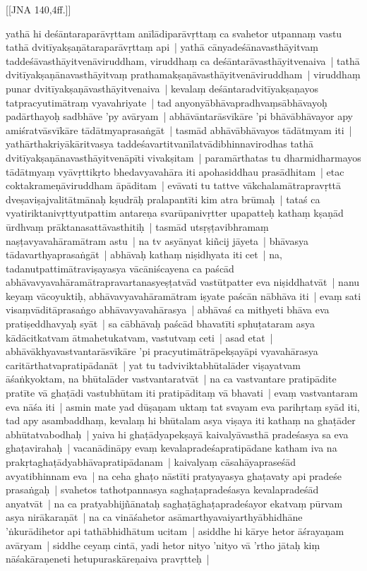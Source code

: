 \documentclass[article,12pt,a4paper]{memoir}
\newcommand{\name}[1]{#1}
\begin{document}
	[[JNA 140,4ff.]]

	  \pstart yathā hi deśāntaraparāvṛttam anīlādiparāvṛttaṃ ca svahetor utpannaṃ vastu tathā dvitīyakṣaṇātaraparāvṛttaṃ api | yathā cānyadeśānavasthāyitvaṃ taddeśāvasthāyitvenāviruddham, viruddhaṃ ca deśāntarāvasthāyitvenaiva | tathā dvitīyakṣaṇānavasthāyitvaṃ prathamakṣaṇāvasthāyitvenāviruddham | viruddhaṃ punar dvitīyakṣaṇāvasthāyitvenaiva | kevalaṃ deśāntaradvitīyakṣaṇayos tatpracyutimātraṃ vyavahriyate | tad anyonyābhāvapradhvaṃsābhāvayoḥ padārthayoḥ sadbhāve 'py avāryam | abhāvāntarāsvīkāre 'pi bhāvābhāvayor apy amiśratvāsvīkāre tādātmyaprasaṅgāt | tasmād abhāvābhāvayos tādātmyam iti | \label{thakur75-122.16} yathārthakriyākāritvasya taddeśavartitvanīlatvādibhinnavirodhas tathā dvitīyakṣaṇānavasthāyitvenāpīti vivakṣitam | paramārthatas tu dharmidharmayos tādātmyaṃ vyāvṛttikṛto bhedavyavahāra iti \name{apohasiddhau} prasādhitam | etac coktakrameṇāviruddham āpāditam | evāvati tu tattve vākchalamātrapravṛttā dveṣaviṣajvalitātmānaḥ kṣudrāḥ pralapantīti kim atra brūmaḥ | \label{thakur75-122.21} tataś ca vyatiriktanivṛttyutpattim antareṇa svarūpanivṛtter upapatteḥ kathaṃ kṣaṇād ūrdhvaṃ prāktanasattāvasthitiḥ | tasmād utsṛṣṭavibhramaṃ naṣṭavyavahāramātram astu | na tv asyānyat kiñcij jāyeta | \label{thakur75-122.23} bhāvasya tādavarthyaprasaṅgāt | abhāvaḥ kathaṃ niṣidhyata iti cet | \label{thakur75-122.24} na, tadanutpattimātraviṣayasya vācāniścayena ca paścād abhāvavyavahāramātrapravartanasyeṣṭatvād vastūtpatter eva niṣiddhatvāt | \label{thakur75-122.26} nanu keyaṃ vācoyuktiḥ, abhāvavyavahāramātram iṣyate paścān nābhāva iti | evaṃ sati visaṃvāditāprasaṅgo abhāvavyavahārasya | abhāvaś ca mithyeti bhāva eva pratiṣeddhavyaḥ syāt | sa cābhāvaḥ paścād bhavatīti sphuṭataram asya kādācitkatvam ātmahetukatvam, vastutvaṃ ceti | \label{thakur75-122.29} asad etat | abhāvākhyavastvantarāsvīkāre 'pi pracyutimātrāpekṣayāpi vyavahārasya caritārthatvapratipādanāt | yat tu tadviviktabhūtalāder viṣayatvam āśaṅkyoktam, na bhūtalāder vastvantaratvāt | na ca vastvantare pratipādite pratīte vā ghaṭādi vastubhūtam iti pratipāditaṃ vā bhavati | \label{thakur75-123.1} evaṃ vastvantaram eva nāśa iti | asmin mate yad dūṣaṇam uktaṃ tat svayam eva parihṛtaṃ syād iti, tad apy asambaddhaṃ, kevalaṃ hi bhūtalam asya viṣaya iti kathaṃ na ghaṭāder abhūtatvabodhaḥ | yaiva hi ghaṭādyapekṣayā kaivalyāvasthā pradeśasya sa eva ghaṭavirahaḥ | vacanādināpy evaṃ kevalapradeśapratipādane katham iva na prakṛtaghaṭādyabhāvapratipādanam | kaivalyaṃ cāsahāyapraseśād avyatibhinnam eva | \label{thakur75-123.6} na ceha ghaṭo nāstīti pratyayasya ghaṭavaty api pradeśe prasaṅgaḥ | svahetos tathotpannasya saghaṭapradeśasya kevalapradeśād anyatvāt | \label{thakur75-123.7} na ca pratyabhijñānataḥ saghaṭāghaṭapradeśayor ekatvaṃ pūrvam asya nirākaraṇāt | \label{thakur75-123.8} na ca vināśahetor asāmarthyavaiyarthyābhidhāne 'ṅkurādihetor api tathābhidhātum ucitam | asiddhe hi kārye hetor āśrayaṇam avāryam | siddhe ceyaṃ cintā, yadi hetor nityo 'nityo vā 'rtho jātaḥ kiṃ nāśakāraṇeneti hetupuraskāreṇaiva pravṛtteḥ | 
\end{document}
